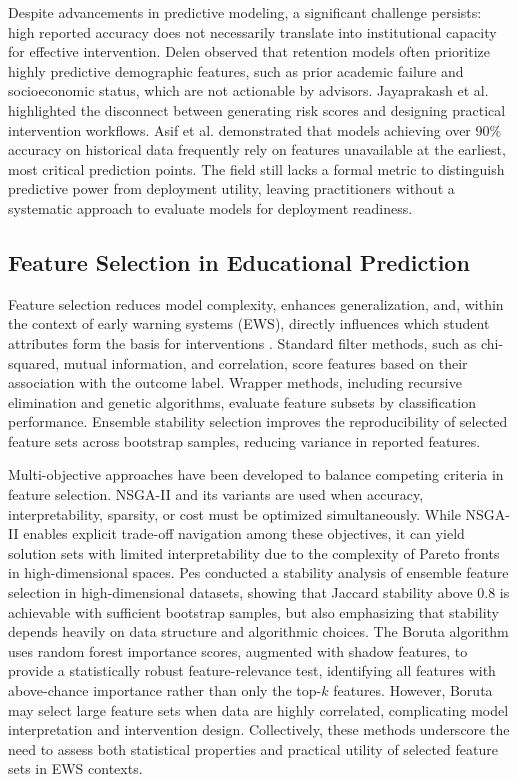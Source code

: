 \documentclass[a4paper,fleqn]{cas-sc}
\begin{document}
Despite advancements in predictive modeling, a significant challenge persists: high reported accuracy does not necessarily translate into institutional capacity for effective intervention. Delen \cite{delen2010} observed that retention models often prioritize highly predictive demographic features, such as prior academic failure and socioeconomic status, which are not actionable by advisors. Jayaprakash et al. \cite{jayaprakash2014} highlighted the disconnect between generating risk scores and designing practical intervention workflows. Asif et al. \cite{asif2017} demonstrated that models achieving over 90\% accuracy on historical data frequently rely on features unavailable at the earliest, most critical prediction points. The field still lacks a formal metric to distinguish predictive power from deployment utility, leaving practitioners without a systematic approach to evaluate models for deployment readiness.

\subsection{Feature Selection in Educational Prediction}
Feature selection reduces model complexity, enhances generalization, and, within the context of early warning systems (EWS), directly influences which student attributes form the basis for interventions \cite{li2017}. Standard filter methods, such as chi-squared, mutual information, and correlation, score features based on their association with the outcome label. Wrapper methods, including recursive elimination and genetic algorithms, evaluate feature subsets by classification performance. Ensemble stability selection \cite{meinshausen2010} improves the reproducibility of selected feature sets across bootstrap samples, reducing variance in reported features.

Multi-objective approaches have been developed to balance competing criteria in feature selection. NSGA-II \cite{deb2002} and its variants are used when accuracy, interpretability, sparsity, or cost must be optimized simultaneously. While NSGA-II enables explicit trade-off navigation among these objectives, it can yield solution sets with limited interpretability due to the complexity of Pareto fronts in high-dimensional spaces. Pes \cite{pes2020} conducted a stability analysis of ensemble feature selection in high-dimensional datasets, showing that Jaccard stability above 0.8 is achievable with sufficient bootstrap samples, but also emphasizing that stability depends heavily on data structure and algorithmic choices. The Boruta algorithm \cite{kursa2010} uses random forest importance scores, augmented with shadow features, to provide a statistically robust feature-relevance test, identifying all features with above-chance importance rather than only the top-$k$ features. However, Boruta may select large feature sets when data are highly correlated, complicating model interpretation and intervention design. Collectively, these methods underscore the need to assess both statistical properties and practical utility of selected feature sets in EWS contexts.
\end{document}
